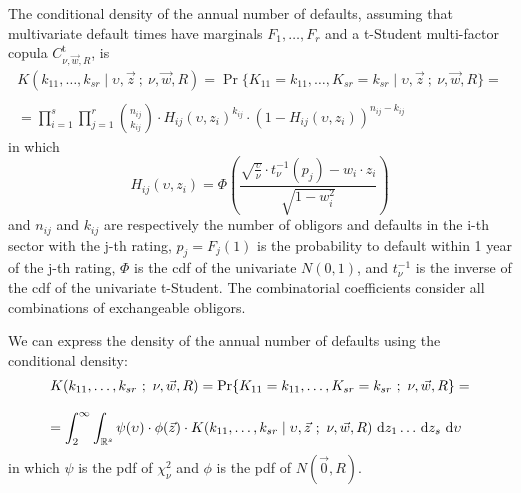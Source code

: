 \documentclass[11pt,fleqn]{book} %
\begin{document}
\begin{proposition}
	\label{prop:cdand}
	The conditional density of the annual number of defaults, assuming 
	that multivariate default times have marginals $F_1,\dots,F_r$ and a 
	t-Student multi-factor copula $C_{\nu,\vec{w},R}^{\text{t}}$, is
	\begin{displaymath}
		\begin{array}{l}
			K(k_{11},\dots,k_{sr} \mid \upsilon,\vec{z}\ ;\ \nu,\vec{w}, R) = 
			\Pr\{K_{11}=k_{11},\dots,K_{sr}=k_{sr} \mid \upsilon,\vec{z}\ ;\ \nu, \vec{w}, R\} = \\
			\\
			= \displaystyle \prod_{i=1}^s \prod_{j=1}^r \binom{n_{ij}}{k_{ij}} \cdot
			H_{ij}(\upsilon,z_i)^{k_{ij}} \cdot
			\left( 1 - H_{ij}(\upsilon,z_i) \right)^{n_{ij}-k_{ij}}
		\end{array}
	\end{displaymath}
	in which
	\begin{displaymath}
		H_{ij}(\upsilon,z_i) = \Phi\left(  
		\frac{\sqrt{\frac{\upsilon}{\nu}} \cdot t_{\nu}^{-1}(p_j) - w_i\cdot z_i}{\sqrt{1-w_i^2}}
		\right)
	\end{displaymath}
	and $n_{ij}$ and $k_{ij}$ are respectively the number of obligors and 
	defaults in the i-th sector with the j-th rating, $p_j = F_j(1)$ 
	is the probability to default within 1 year of the j-th rating,
	$\Phi$ is the cdf of the univariate $N(0,1)$, and $t_{\nu}^{-1}$ is the 
	inverse of the cdf of the univariate t-Student. The combinatorial 
	coefficients consider all combinations of exchangeable obligors.
\end{proposition}

\begin{corollary}
	We can express the density of the annual number of defaults using 
	the conditional density:
	\begin{displaymath}
		\begin{array}{l}
			K(k_{11},\dots,k_{sr}\ ;\ \nu, \vec{w}, R) = 
			\Pr\{K_{11}=k_{11},\dots,K_{sr}=k_{sr}\ ;\ \nu, \vec{w}, R\} = \\
			\\
			= \displaystyle \int_2^{\infty} \int_{\mathbb{R}^s}
			\psi(\upsilon) \cdot \phi(\vec{z}) \cdot
			K(k_{11},\dots,k_{sr} \mid \upsilon,\vec{z}\ ;\ \nu,\vec{w}, R) 
			\mathop{\,\mathrm{{}d}}\mathopen{} z_1 \dots \mathop{\,\mathrm{{}d}}\mathopen{} z_s \mathop{\,\mathrm{{}d}}\mathopen{} \upsilon
		\end{array}
	\end{displaymath}
	in which $\psi$ is the pdf of $\chi_{\nu}^2$ and $\phi$ is the pdf 
	of $N(\vec{0},R)$.
\end{corollary}
\end{document}
